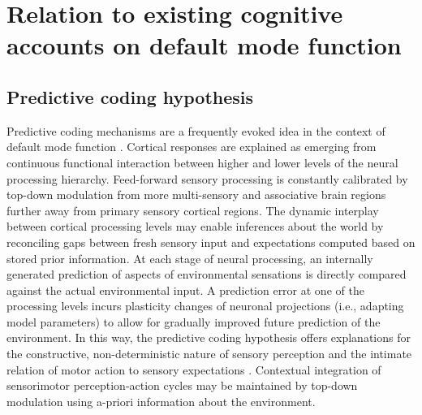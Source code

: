 \documentclass[10pt,letterpaper]{article}
\begin{document}
\section{Relation to existing cognitive accounts on default mode function}
\subsection{Predictive coding hypothesis}
Predictive coding mechanisms
\citep{clark2013whatever, friston2008hierarchical}
are a frequently evoked idea in the context of default mode function
\citep{bar2007}.
Cortical responses are explained as
emerging from continuous functional interaction between
higher and lower levels of the neural processing hierarchy.
Feed-forward sensory processing is constantly calibrated by
top-down modulation from more multi-sensory and associative brain regions
further away from primary sensory cortical regions.
The dynamic interplay between cortical processing levels
may enable inferences about the world by reconciling
gaps between fresh sensory input and expectations computed
based on stored prior information.
At each stage of neural processing,
an internally generated prediction of aspects of environmental sensations is
directly compared against the actual environmental input.
A prediction error at one of the processing levels
incurs plasticity changes of neuronal projections
(i.e., adapting model parameters)
to allow for gradually improved future prediction of the environment.
In this way,
the predictive coding hypothesis offers explanations for
the constructive, non-deterministic nature of sensory perception
\citep{friston2010free, buzsaki2006rhythms} and
the intimate relation of motor action to sensory expectations
\citep{wolpert1995internal, kording2004bayesian}.
Contextual integration of sensorimotor perception-action cycles
may be maintained by top-down modulation
using a-priori information about the environment.
\end{document}

